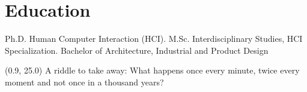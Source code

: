 \documentclass[full]{rvca}
\begin{document}
\section{Education}

Ph.D. Human Computer Interaction (HCI).
M.Sc. Interdisciplinary Studies, HCI Specialization.
Bachelor of Architecture, Industrial and Product Design


\begin{textblock}{4.3}(0.9, 25.0)
\scriptsize \centering A riddle to take away: What happens once every minute, twice every moment and not once in a thousand years?
\end{textblock}
\end{document}
